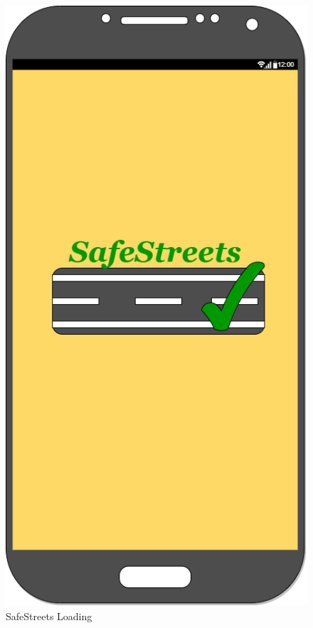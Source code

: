 \documentclass[titlepage]{article}
\begin{document}
\begin{itemize}
\begin{itemize}
	\begin{figure}[h]
	\includegraphics[scale=0.3]{Mockups/Introduction.png}
	\centering
	\caption{SafeStreets Loading}
	\end{figure}
	\FloatBarrier
	
	\newpage
	

\end{itemize}
\end{itemize}
\end{document}
